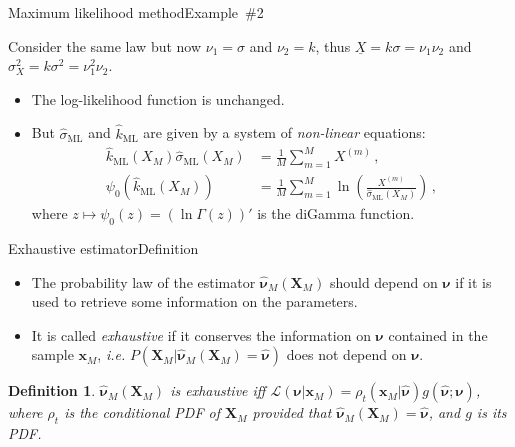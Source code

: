\documentclass{beamer}
\newcommand{\xgj}{x}
\newcommand{\xg}{{\boldsymbol\xgj}}
\newcommand{\mean}[1]{\underline{#1}}
\newcommand{\pdf}{\rho}
\newcommand{\tpdf}{\pdf_t}
\newcommand{\Xgj}{X}
\newcommand{\Xg}{{\boldsymbol\Xgj}}
\newcommand{\paraj}{\nu}
\newcommand{\parag}{{\boldsymbol\paraj}}
\newcommand{\parae}{\hat{\parag}}
\newcommand{\likelihood}{{\mathcal L}}
\newtheorem{mydef}{Definition}
\begin{document}
\begin{frame}{Maximum likelihood method}{Example~\#2}

Consider the same law but now $\paraj_1=\sigma$ and $\paraj_2=k$, thus $\mean{\Xgj}=k\sigma=\nu_1\nu_2$ and $\sigma_\Xgj^2=k\sigma^2=\nu_1^2\nu_2$.
\begin{itemize}
\item The log-likelihood function is unchanged.
\item But $\hat{\sigma}_{\text{ML}}$ and $\hat{k}_{\text{ML}}$ are given by a system of \emph{non-linear} equations:
\begin{displaymath}
\begin{split}
\hat{k}_{\text{ML}}(\Xgj_M)\hat{\sigma}_{\text{ML}}(\Xgj_M) &=\frac{1}{M}\sum_{m=1}^M\Xgj^{(m)}\,, \\
\psi_0(\hat{k}_{\text{ML}}(\Xgj_M)) &=\frac{1}{M}\sum_{m=1}^M\ln\left(\frac{\Xgj^{(m)}}{\hat{\sigma}_{\text{ML}}(\Xgj_M)}\right)\,,
\end{split}
\end{displaymath}
where $z\mapsto\psi_0(z)=(\ln\Gamma(z))'$ is the diGamma function.
\end{itemize}

\end{frame}



\begin{frame}{Exhaustive estimator}{Definition}

\begin{itemize}
\item The probability law  of the estimator $\parae_M(\Xg_M)$ should depend on $\parag$ if it is used to retrieve some information on the parameters.
\item It is called \emph{exhaustive} if it conserves the information on $\parag$ contained in the sample $\xg_M$, \emph{i.e.} $P(\Xg_M|\parae_M(\Xg_M)=\parae)$ does not depend on $\parag$.
\end{itemize}
\begin{mydef}
$\parae_M(\Xg_M)$ is exhaustive iff $\likelihood(\parag|\xg_M)=\tpdf(\xg_M|\parae)g(\parae;\parag)$, where $\tpdf$ is the conditional PDF of $\Xg_M$ provided that $\parae_M(\Xg_M)=\parae$, and $g$ is its PDF.
\end{mydef}

\end{frame}
\end{document}
